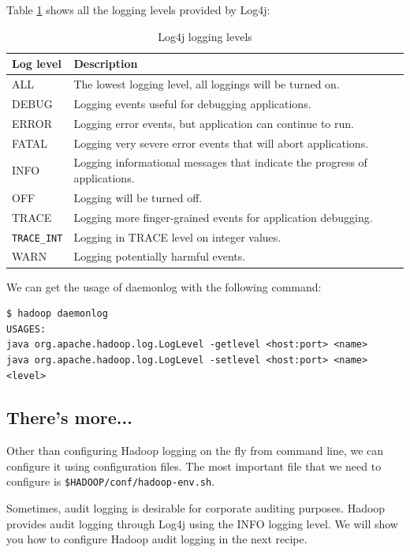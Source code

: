 Table \ref{tbl:log4j} shows all the logging levels provided by Log4j:
\begin{table}
  \begin{tabular}{ll}
    \toprule 
    \textbf{Log level} & \textbf{Description} \\ \midrule
    ALL & The lowest logging level, all loggings will be turned on. \\
    DEBUG & Logging events useful for debugging applications.\\
    ERROR & Logging error events, but application can continue to run. \\
    FATAL & Logging very severe error events that will abort applications. \\
    INFO & Logging informational messages that indicate the progress of applications. \\
    OFF & Logging will be turned off. \\
    TRACE & Logging more finger-grained events for application debugging. \\
    \verb|TRACE_INT| & Logging in TRACE level on integer values. \\
    WARN & Logging potentially harmful events. \\ \bottomrule
  \end{tabular}
  \caption{Log4j logging levels}\label{tbl:log4j}
\end{table}

We can get the usage of daemonlog with the following command:
\lstset{style=bashstyle}
\begin{lstlisting}
$ hadoop daemonlog
USAGES:
java org.apache.hadoop.log.LogLevel -getlevel <host:port> <name>
java org.apache.hadoop.log.LogLevel -setlevel <host:port> <name> <level>
\end{lstlisting}

\subsection*{There's more...}
Other than configuring Hadoop logging on the fly from command line, we can configure it using configuration files. The most important file that we need to configure is \verb|$HADOOP/conf/hadoop-env.sh|.

Sometimes, audit logging is desirable for corporate auditing purposes. Hadoop provides audit logging through Log4j using the INFO logging level. We will show you how to configure Hadoop audit logging in the next recipe.

